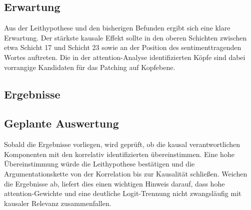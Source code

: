 \subsection{Erwartung}

Aus der Leithypothese und den bisherigen Befunden ergibt sich eine klare Erwartung. Der stärkste kausale Effekt sollte in den oberen Schichten zwischen etwa Schicht 17 und Schicht 23 sowie an der Position des sentimenttragenden Wortes auftreten. Die in der \gls{attention}-Analyse identifizierten Köpfe sind dabei vorrangige Kandidaten für das Patching auf Kopfebene.

\subsection{Ergebnisse}


\subsection{Geplante Auswertung}

Sobald die Ergebnisse vorliegen, wird geprüft, ob die kausal verantwortlichen Komponenten mit den korrelativ identifizierten übereinstimmen. Eine hohe Übereinstimmung würde die Leithypothese bestätigen und die Argumentationskette von der Korrelation bis zur Kausalität schließen. Weichen die Ergebnisse ab, liefert dies einen wichtigen Hinweis darauf, dass hohe \gls{attention}-Gewichte und eine deutliche Logit-Trennung nicht zwangsläufig mit kausaler Relevanz zusammenfallen.

